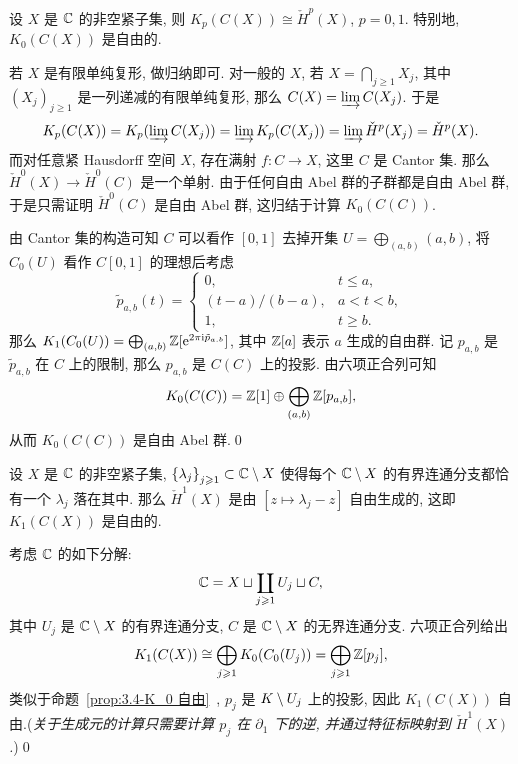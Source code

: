 \begin{Proposition}\label{prop:3.4-K_0 自由}
	设 $ X $ 是 $ \mathbb{C} $ 的非空紧子集, 则 $ K_p(C(X))\cong\check{H}^p(X) $, $ p=0,1 $. 特别地, $ K_0(C(X)) $ 是自由的.
\end{Proposition}
\begin{Proof}
	若 $ X $ 是有限单纯复形, 做归纳即可. 对一般的 $ X $, 若 $ X=\bigcap_{j\geqslant 1}X_j $, 其中 $ (X_j)_{j\geqslant 1} $ 是一列递减的有限单纯复形, 那么 $ C(X)=\varinjlim C(X_j) $. 于是
	\[
		K_p(C(X))=K_p(\varinjlim C(X_j))=\varinjlim K_p(C(X_j))=\varinjlim\check{H}^p(X_j)=\check{H}^p(X).
	\]
	而对任意紧 Hausdorff 空间 $ X $, 存在满射 $ f : C\to X $, 这里 $ C $ 是 Cantor 集. 那么 $ \check{H}^0(X)\to\check{H}^0(C) $ 是一个单射. 由于任何自由 Abel 群的子群都是自由 Abel 群, 于是只需证明 $ \check{H}^0(C) $ 是自由 Abel 群, 这归结于计算 $ K_0(C(C)) $. 
	
	由 Cantor 集的构造可知 $ C $ 可以看作 $ [0,1] $ 去掉开集 $ U=\bigoplus_{(a,b)}(a,b) $, 将 $ C_0(U) $ 看作 $ C[0,1] $ 的理想后考虑
	\[
		\tilde{p}_{a,b}(t)=\begin{cases}
			0, & t\leqslant a,\\ (t-a)/(b-a), & a<t<b, \\ 1, & t\geqslant b.
		\end{cases}
	\]
	那么 $ K_1(C_0(U))=\bigoplus_{(a,b)}\mathbb{Z}[\mathrm{e}^{2\pi\mathrm{i}\tilde{p}_{a.b}}] $, 其中 $ \mathbb{Z}[a] $ 表示 $ a $ 生成的自由群. 记 $ p_{a,b} $ 是 $ \tilde{p}_{a,b} $ 在 $ C $ 上的限制, 那么 $ p_{a,b} $ 是 $ C(C) $ 上的投影. 由六项正合列可知
	\[
		K_0(C(C))=\mathbb{Z}[1]\oplus\bigoplus_{(a,b)}\mathbb{Z}[p_{a,b}],
	\]
	从而 $ K_0(C(C)) $ 是自由 Abel 群.\qed
\end{Proof}

\begin{Proposition}\label{prop:3.4-K_1 自由}
	设 $ X $ 是 $ \mathbb{C} $ 的非空紧子集, $ \left\{ \lambda_j \right\}_{j\geqslant 1}\subset\mathbb{C}\setminus X $ 使得每个 $ \mathbb{C}\setminus X $ 的有界连通分支都恰有一个 $ \lambda_j $ 落在其中. 那么 $ \check{H}^1(X) $ 是由 $ [z\mapsto\lambda_j-z] $ 自由生成的, 这即 $ K_1(C(X)) $ 是自由的.
\end{Proposition}
\begin{Proof}
	考虑 $ \mathbb{C} $ 的如下分解:
	\[
		\mathbb{C}=X\sqcup\coprod_{j\geqslant 1}U_j\sqcup C,
	\]
	其中 $ U_j $ 是 $ \mathbb{C}\setminus X $ 的有界连通分支, $ C $ 是 $ \mathbb{C}\setminus X $ 的无界连通分支. 六项正合列给出
	\[
		K_1(C(X))\cong\bigoplus_{j\geqslant 1}K_0(C_0(U_j))=\bigoplus_{j\geqslant 1}\mathbb{Z}[p_j],
	\]
	类似于命题~\ref{prop:3.4-K_0 自由}~, $ p_j $ 是 $ K\setminus U_j $ 上的投影, 因此 $ K_1(C(X)) $ 自由.(\textit{关于生成元的计算只需要计算 $ p_j $ 在 $ \partial_1 $ 下的逆, 并通过特征标映射到 $ \check{H}^1(X) $.})\qed
\end{Proof}

